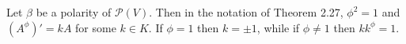 Let $\beta$ be a polarity of $\mathcal{P}(V)$. Then in the notation of Theorem 2.27, $\phi^2 = 1$ and $(A^\phi)' = kA$ for some $k \in K$. If $\phi = 1$ then $k = \pm 1$, while if $\phi \neq 1$ then $kk^\phi = 1$.
